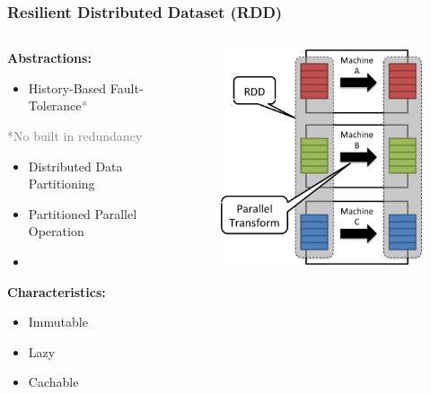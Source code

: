 \documentclass[xcolor={dvipsnames}]{beamer}
\begin{document}
\frame
{
\frametitle{Resilient Distributed Dataset (RDD)}

\begin{columns}

\begin{column}{.4\textwidth}

\textbf{Abstractions:} 
\begin{itemize}
\item History-Based Fault-Tolerance\textcolor{gray}{*} \\
\end{itemize} 
\textcolor{gray}{*No built in redundancy} 
\begin{itemize}
\item Distributed Data Partitioning
\item Partitioned Parallel Operation 
\item[]
\end{itemize} 


\textbf{Characteristics:} 
\begin{itemize}
\item Immutable 
\item Lazy
\item Cachable 
\end{itemize} 


\end{column}
\hspace{-3em}
\begin{column}{.6\textwidth}

\begin{figure}
\includegraphics[width=2.5in]{stuff/spark2.png}$\quad\quad\quad\quad$
\end{figure}

\end{column}

\end{columns}

}
\end{document}
